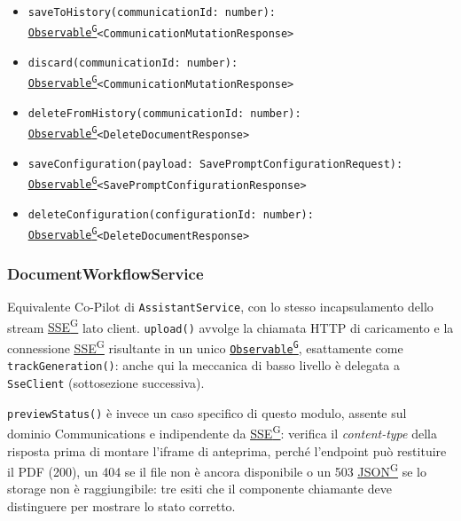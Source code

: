 \documentclass[a4paper,12pt]{article}
\providecommand{\glslink}[2]{\href{https://alittlebyte-19.github.io/Documentazione/glossario.html\#gls-#1}{\underline{#2}\textsuperscript{\scriptsize G}}}
\begin{document}
\begin{sloppypar}
\begin{itemize}
    \item \texttt{saveToHistory(communicationId: number):}\\ \hspace*{1.5em}\texttt{\glslink{observable}{Observable}<CommunicationMutationResponse>}
    \item \texttt{discard(communicationId: number):}\\ \hspace*{1.5em}\texttt{\glslink{observable}{Observable}<CommunicationMutationResponse>}
    \item \texttt{deleteFromHistory(communicationId: number):}\\ \hspace*{1.5em}\texttt{\glslink{observable}{Observable}<DeleteDocumentResponse>}
    \item \texttt{saveConfiguration(payload: SavePromptConfigurationRequest):}\\ \hspace*{1.5em}\texttt{\glslink{observable}{Observable}<SavePromptConfigurationResponse>}
    \item \texttt{deleteConfiguration(configurationId: number):}\\ \hspace*{1.5em}\texttt{\glslink{observable}{Observable}<DeleteDocumentResponse>}
\end{itemize}

\subsubsection{DocumentWorkflowService}

Equivalente Co-Pilot di \texttt{AssistantService}, con lo stesso incapsulamento dello stream \glslink{sse-server-sent-events}{SSE} lato client. \texttt{upload()} avvolge la chiamata HTTP di caricamento e la connessione \glslink{sse-server-sent-events}{SSE} risultante in un unico \texttt{\glslink{observable}{Observable}}, esattamente come \texttt{trackGeneration()}: anche qui la meccanica di basso livello è delegata a \texttt{SseClient} (sottosezione successiva).

\texttt{previewStatus()} è invece un caso specifico di questo modulo, assente sul dominio Communications e indipendente da \glslink{sse-server-sent-events}{SSE}: verifica il \textit{content-type} della risposta prima di montare l'iframe di anteprima, perché l'endpoint può restituire il PDF (200), un 404 se il file non è ancora disponibile o un 503 \glslink{json}{JSON} se lo storage non è raggiungibile: tre esiti che il componente chiamante deve distinguere per mostrare lo stato corretto.


\end{sloppypar}
\end{document}
